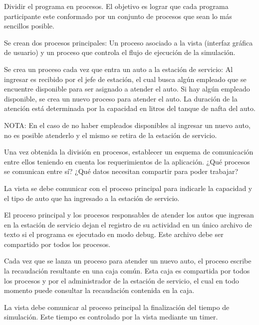 \documentclass[12pt,a4paper,titlepage,oneside]{article}
\renewenvironment{itemize}{
 \begin{list}{}{
  \setlength{\leftmargin}{1.5em}
 }
}{
 \end{list}
}
\begin{document}
\begin{enumerate}
\item Dividir el programa en procesos. El objetivo es lograr que cada programa participante este conformado por un conjunto de procesos que sean lo más sencillos posible.

\begin{itemize}
\item[•] Se crean dos procesos principales: Un proceso asociado a la vista (interfaz gráfica de usuario) y un proceso que controla el flujo de ejecución de la simulación.
\item[•] Se crea un proceso cada vez que entra un auto a la estación de servicio: Al ingresar es recibido por el jefe de estación, el cual busca algún empleado que se encuentre disponible para ser asignado a atender el auto. Si hay algún empleado disponible, se crea un nuevo proceso para atender el auto. La duración de la atención está determinada por la capacidad en litros del tanque de nafta del auto.
\end{itemize}

NOTA: En el caso de no haber empleados disponibles al ingresar un nuevo auto, no es posible atenderlo y el mismo se retira de la estación de servicio.

\item Una vez obtenida la división en procesos, establecer un esquema de comunicación entre ellos teniendo en cuenta los requerimientos de la aplicación. ¿Qué procesos se comunican entre sí? ¿Qué datos necesitan compartir para poder trabajar?

\begin{itemize}
\item[•] La vista se debe comunicar con el proceso principal para indicarle la capacidad y el tipo de auto que ha ingresado a la estación de servicio.
\item[•] El proceso principal y los procesos responsables de atender los autos que ingresan en la estación de servicio dejan el registro de su actividad en un único archivo de texto si el programa es ejecutado en modo debug. Este archivo debe ser compartido por todos los procesos.
\item[•] Cada vez que se lanza un proceso para atender un nuevo auto, el proceso escribe la recaudación resultante en una caja común. Esta caja es compartida por todos los procesos y por el administrador de la estación de servicio, el cual en todo momento puede consultar la recaudación contenida en la caja.
\item[•] La vista debe comunicar al proceso principal la finalización del tiempo de simulación. Este tiempo es controlado por la vista mediante un timer.
\end{itemize}


\end{enumerate}
\end{document}
